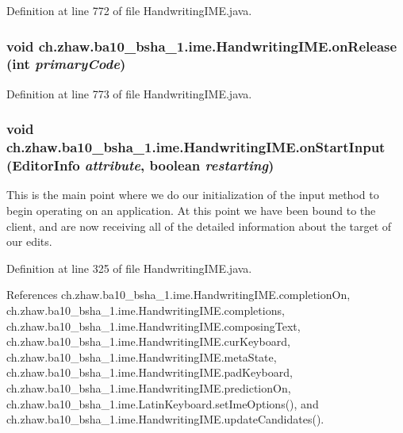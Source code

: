 Definition at line 772 of file HandwritingIME.java.\hypertarget{classch_1_1zhaw_1_1ba10__bsha__1_1_1ime_1_1HandwritingIME_adf013e6d8fc9b5d0e567fe93f5f6511a}{
\subsubsection[{onRelease}]{\setlength{\rightskip}{0pt plus 5cm}void ch.zhaw.ba10\_\-bsha\_\-1.ime.HandwritingIME.onRelease (int {\em primaryCode})}}
\label{classch_1_1zhaw_1_1ba10__bsha__1_1_1ime_1_1HandwritingIME_adf013e6d8fc9b5d0e567fe93f5f6511a}


Definition at line 773 of file HandwritingIME.java.\hypertarget{classch_1_1zhaw_1_1ba10__bsha__1_1_1ime_1_1HandwritingIME_abb0bfa8e1c7857a88657e6640855af0f}{
\subsubsection[{onStartInput}]{\setlength{\rightskip}{0pt plus 5cm}void ch.zhaw.ba10\_\-bsha\_\-1.ime.HandwritingIME.onStartInput (EditorInfo {\em attribute}, \/  boolean {\em restarting})}}
\label{classch_1_1zhaw_1_1ba10__bsha__1_1_1ime_1_1HandwritingIME_abb0bfa8e1c7857a88657e6640855af0f}
This is the main point where we do our initialization of the input method to begin operating on an application. At this point we have been bound to the client, and are now receiving all of the detailed information about the target of our edits. 

Definition at line 325 of file HandwritingIME.java.

References ch.zhaw.ba10\_\-bsha\_\-1.ime.HandwritingIME.completionOn, ch.zhaw.ba10\_\-bsha\_\-1.ime.HandwritingIME.completions, ch.zhaw.ba10\_\-bsha\_\-1.ime.HandwritingIME.composingText, ch.zhaw.ba10\_\-bsha\_\-1.ime.HandwritingIME.curKeyboard, ch.zhaw.ba10\_\-bsha\_\-1.ime.HandwritingIME.metaState, ch.zhaw.ba10\_\-bsha\_\-1.ime.HandwritingIME.padKeyboard, ch.zhaw.ba10\_\-bsha\_\-1.ime.HandwritingIME.predictionOn, ch.zhaw.ba10\_\-bsha\_\-1.ime.LatinKeyboard.setImeOptions(), and ch.zhaw.ba10\_\-bsha\_\-1.ime.HandwritingIME.updateCandidates().

